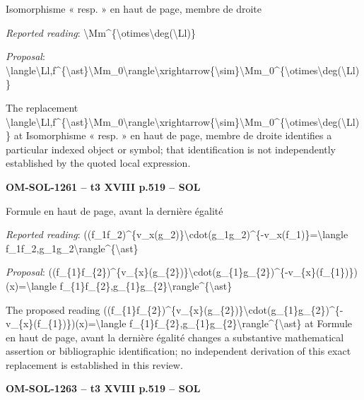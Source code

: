 Isomorphisme « resp. » en haut de page, membre de droite\par
\emph{Reported reading}: \textbackslash{}Mm\textasciicircum{}\{\textbackslash{}otimes\textbackslash{}deg(\textbackslash{}Ll)\}\par
\emph{Proposal}: \textbackslash{}langle\textbackslash{}Ll,f\textasciicircum{}\{\textbackslash{}ast\}\textbackslash{}Mm\_0\textbackslash{}rangle\textbackslash{}xrightarrow\{\textbackslash{}sim\}\textbackslash{}Mm\_0\textasciicircum{}\{\textbackslash{}otimes\textbackslash{}deg(\textbackslash{}Ll)\}\par
The replacement \textbackslash{}langle\textbackslash{}Ll,f\textasciicircum{}\{\textbackslash{}ast\}\textbackslash{}Mm\_0\textbackslash{}rangle\textbackslash{}xrightarrow\{\textbackslash{}sim\}\textbackslash{}Mm\_0\textasciicircum{}\{\textbackslash{}otimes\textbackslash{}deg(\textbackslash{}Ll)\} at Isomorphisme « resp. » en haut de page, membre de droite identifies a particular indexed object or symbol; that identification is not independently established by the quoted local expression.\par
\par\noindent\textbf{OM-SOL-1261 -- t3 XVIII p.519 -- SOL}\par
Formule en haut de page, avant la dernière égalité\par
\emph{Reported reading}: ((f\_1f\_2)\textasciicircum{}\{v\_x(g\_2)\}\textbackslash{}cdot(g\_1g\_2)\textasciicircum{}\{-v\_x(f\_1)\}=\allowbreak \textbackslash{}langle f\_1f\_2,g\_1g\_2\textbackslash{}rangle\textasciicircum{}\{\textbackslash{}ast\}\par
\emph{Proposal}: ((f\_\{1\}f\_\{2\})\textasciicircum{}\{v\_\{x\}(g\_\{2\})\}\textbackslash{}cdot(g\_\{1\}g\_\{2\})\textasciicircum{}\{-v\_\{x\}(f\_\{1\})\})(x)=\allowbreak \textbackslash{}langle f\_\{1\}f\_\{2\},g\_\{1\}g\_\{2\}\textbackslash{}rangle\textasciicircum{}\{\textbackslash{}ast\}\par
The proposed reading ((f\_\{1\}f\_\{2\})\textasciicircum{}\{v\_\{x\}(g\_\{2\})\}\textbackslash{}cdot(g\_\{1\}g\_\{2\})\textasciicircum{}\{-v\_\{x\}(f\_\{1\})\})(x)=\allowbreak \textbackslash{}langle f\_\{1\}f\_\{2\},g\_\{1\}g\_\{2\}\textbackslash{}rangle\textasciicircum{}\{\textbackslash{}ast\} at Formule en haut de page, avant la dernière égalité changes a substantive mathematical assertion or bibliographic identification; no independent derivation of this exact replacement is established in this review.\par
\par\noindent\textbf{OM-SOL-1263 -- t3 XVIII p.519 -- SOL}\par
